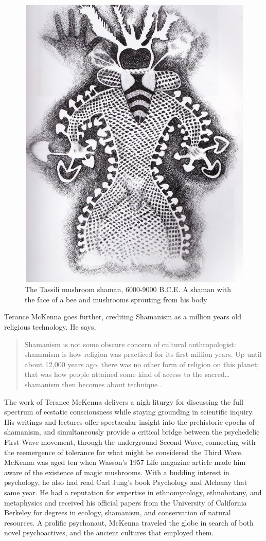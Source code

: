 \documentclass{UIdahoMastersThesis}
\begin{document}
 
\begin{figure}%
	\centering
	\includegraphics[width=0.54\linewidth]{tassili.jpg}
	\caption{The Tassili mushroom shaman, 6000-9000 B.C.E. A shaman with the face of a bee and mushrooms sprouting from his body}
	\label{fig:tassili}
\end{figure}
Terance McKenna goes further, crediting Shamanism as a million years old religious technology. He says, 

\begin{quote}
{Shamanism is not some obscure concern of cultural anthropologist: shamanism is how religion was practiced for its first million years. Up until about 12,000 years ago, there was no other form of religion on this planet; that was how people attained some kind of access to the sacred\ldots shamanism then becomes about technique \cite{noauthor_terence_nodate}.}
\end{quote}

The work of Terance McKenna delivers a nigh liturgy for discussing the full spectrum of ecstatic consciousness while staying grounding in scientific inquiry. His writings and lectures offer spectacular insight into the prehistoric epochs of shamanism, and simultaneously provide a critical bridge between the psychedelic First Wave movement, through the underground Second Wave, connecting with the reemergence of tolerance for what might be considered the Third Wave. McKenna was aged ten when Wasson's 1957 Life magazine article made him aware of the existence of magic mushrooms. With a budding interest in psychology, he also had read Carl Jung's book Psychology and Alchemy that same year. He had a reputation for expertise in ethnomycology, ethnobotany, and metaphysics and received his official papers from the University of California Berkeley for degrees in ecology, shamanism, and conservation of natural resources. A prolific psychonaut, McKenna traveled the globe in search of both novel psychoactives, and the ancient cultures that employed them.
\end{document}
